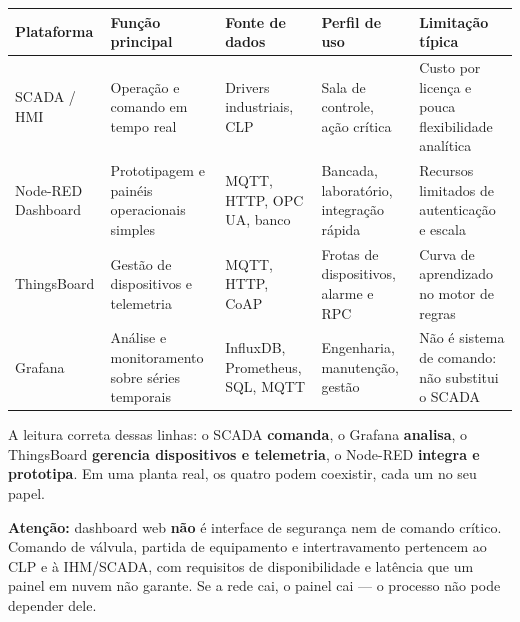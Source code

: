 \begin{longtable}[]{@{}
  >{\raggedright\arraybackslash}p{}
  >{\raggedright\arraybackslash}p{}
  >{\raggedright\arraybackslash}p{}
  >{\raggedright\arraybackslash}p{}
  >{\raggedright\arraybackslash}p{}@{}}
\toprule\noalign{}
\begin{minipage}[b]{\linewidth}\raggedright
Plataforma
\end{minipage} & \begin{minipage}[b]{\linewidth}\raggedright
Função principal
\end{minipage} & \begin{minipage}[b]{\linewidth}\raggedright
Fonte de dados
\end{minipage} & \begin{minipage}[b]{\linewidth}\raggedright
Perfil de uso
\end{minipage} & \begin{minipage}[b]{\linewidth}\raggedright
Limitação típica
\end{minipage} \\
\midrule\noalign{}
\endhead
\bottomrule\noalign{}
\endlastfoot
SCADA / HMI & Operação e comando em tempo real & Drivers industriais, CLP & Sala de controle, ação crítica & Custo por licença e pouca flexibilidade analítica \\
Node-RED Dashboard & Prototipagem e painéis operacionais simples & MQTT, HTTP, OPC UA, banco & Bancada, laboratório, integração rápida & Recursos limitados de autenticação e escala \\
ThingsBoard & Gestão de dispositivos e telemetria & MQTT, HTTP, CoAP & Frotas de dispositivos, alarme e RPC & Curva de aprendizado no motor de regras \\
Grafana & Análise e monitoramento sobre séries temporais & InfluxDB, Prometheus, SQL, MQTT & Engenharia, manutenção, gestão & Não é sistema de comando: não substitui o SCADA \\
\end{longtable}

A leitura correta dessas linhas: o SCADA \textbf{comanda}, o Grafana \textbf{analisa}, o ThingsBoard \textbf{gerencia dispositivos e telemetria}, o Node-RED \textbf{integra e prototipa}. Em uma planta real, os quatro podem coexistir, cada um no seu papel.

\begin{caixaatencao}

\textbf{Atenção:} dashboard web \textbf{não} é interface de segurança nem de comando crítico. Comando de válvula, partida de equipamento e intertravamento pertencem ao CLP e à IHM/SCADA, com requisitos de disponibilidade e latência que um painel em nuvem não garante. Se a rede cai, o painel cai --- o processo não pode depender dele.

\end{caixaatencao}

